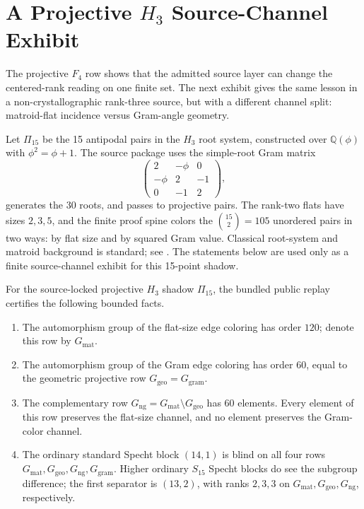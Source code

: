 \section{A Projective \texorpdfstring{\(H_3\)}{H3} Source-Channel Exhibit}
\label{sec:h3-source-channel}

The projective \(F_4\) row shows that the admitted source layer can change the centered-rank reading on one finite set.  The next exhibit gives the same lesson in a non-crystallographic rank-three source, but with a different channel split: matroid-flat incidence versus Gram-angle geometry.

Let \(\Pi_{15}\) be the 15 antipodal pairs in the \(H_3\) root system, constructed over \(\mathbb Q(\phi)\) with \(\phi^2=\phi+1\).  The source package uses the simple-root Gram matrix
\[
\begin{pmatrix}
2&-\phi&0\\
-\phi&2&-1\\
0&-1&2
\end{pmatrix},
\]
generates the 30 roots, and passes to projective pairs.  The rank-two flats have sizes \(2,3,5\), and the finite proof spine colors the \(\binom{15}{2}=105\) unordered pairs in two ways: by flat size and by squared Gram value.  Classical root-system and matroid background is standard; see \cite{BjornerBrenti2005,DutourSikiricFeliksonTumarkin2008RootMatroids}.  The statements below are used only as a finite source-channel exhibit for this 15-point shadow.

\begin{proposition}
\label{prop:h3-source-channel}
For the source-locked projective \(H_3\) shadow \(\Pi_{15}\), the bundled public replay certifies the following bounded facts.
\begin{enumerate}[label=\textup{(\alph*)},leftmargin=*]
  \item The automorphism group of the flat-size edge coloring has order \(120\); denote this row by \(G_{\mathrm{mat}}\).
  \item The automorphism group of the Gram edge coloring has order \(60\), equal to the geometric projective row \(G_{\mathrm{geo}}=G_{\mathrm{gram}}\).
  \item The complementary row \(G_{\mathrm{ng}}=G_{\mathrm{mat}}\setminus G_{\mathrm{geo}}\) has \(60\) elements.  Every element of this row preserves the flat-size channel, and no element preserves the Gram-color channel.
  \item The ordinary standard Specht block \((14,1)\) is blind on all four rows \(G_{\mathrm{mat}},G_{\mathrm{geo}},G_{\mathrm{ng}},G_{\mathrm{gram}}\).  Higher ordinary \(S_{15}\) Specht blocks do see the subgroup difference; the first separator is \((13,2)\), with ranks \(2,3,3\) on \(G_{\mathrm{mat}},G_{\mathrm{geo}},G_{\mathrm{ng}}\), respectively.
\end{enumerate}
\end{proposition}

